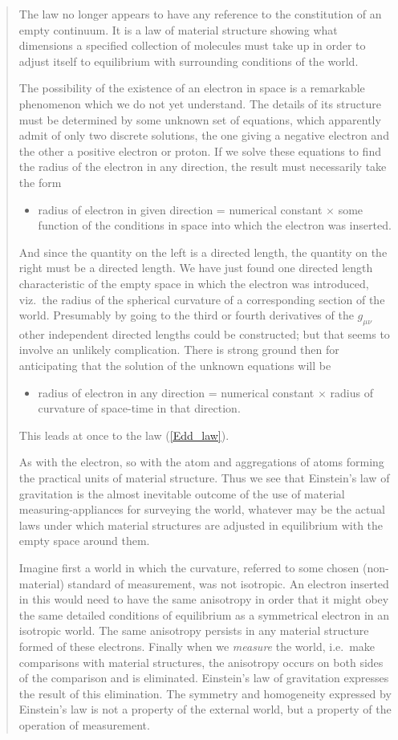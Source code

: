 \begin{quotation}
The law no longer appears to have any reference to the constitution of an empty continuum. It is a law of material structure showing what dimensions a specified collection of molecules must take up in order to adjust itself to equilibrium with surrounding conditions of the world.

The possibility of the existence of an electron in space is a remarkable phenomenon which we do not yet understand. The details of its structure must be determined by some unknown set of equations, which apparently admit of only two discrete solutions, the one giving a negative electron and the other a positive electron or proton. If we solve these equations to find the radius of the electron in any direction, the result must necessarily take the form
\begin{itemize}
\item[~]radius of electron in given direction = numerical constant $\times$ some function of the conditions in space into which the electron was inserted.
\end{itemize}
And since the quantity on the left is a directed length, the quantity on the right must be a directed length. We have just found one directed length characteristic of the empty space in which the electron was introduced, viz.~the radius of the spherical curvature of a corresponding section of the world. Presumably by going to the third or fourth derivatives of the $g_{\mu\nu}$ other independent directed lengths could be constructed; but that seems to involve an unlikely complication. There is strong ground then for anticipating that the solution of the unknown equations will be
\begin{itemize}
\item[~]radius of electron in any direction = numerical constant $\times$ radius of curvature of space-time in that direction. 
\end{itemize}
This leads at once to the law (\ref{Edd_law}).

As with the electron, so with the atom and aggregations of atoms forming the practical units of material structure. Thus we see that Einstein's law of gravitation is the almost inevitable outcome of the use of material measuring-appliances for surveying the world, whatever may be the actual laws under which material structures are adjusted in equilibrium with the empty space around them.

Imagine first a world in which the curvature, referred to some chosen (non-material) standard of measurement, was not isotropic. An electron inserted in this would need to have the same anisotropy in order that it might obey the same detailed conditions of equilibrium as a symmetrical electron in an isotropic world. The same anisotropy persists in any material structure formed of these electrons. Finally when we \textit{measure} the world, i.e.~make comparisons with material structures, the anisotropy occurs on both sides of the comparison and is eliminated. Einstein's law of gravitation expresses the result of this elimination. The symmetry and homogeneity expressed by Einstein's law is not a property of the external world, but a property of the operation of measurement.


\end{quotation}
